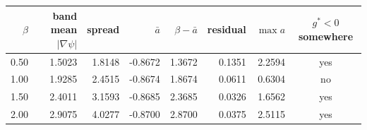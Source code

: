 \begin{tabular}{rrrrrrrc}
\toprule
$\beta$ & band mean $|\nabla\psi|$ & spread & $\bar a$ & $\beta-\bar a$ & residual & $\max a$ & $g^*<0$ somewhere \\
\midrule
0.50 & 1.5023 & 1.8148 & -0.8672 & 1.3672 & 0.1351 & 2.2594 & yes \\
1.00 & 1.9285 & 2.4515 & -0.8674 & 1.8674 & 0.0611 & 0.6304 & no \\
1.50 & 2.4011 & 3.1593 & -0.8685 & 2.3685 & 0.0326 & 1.6562 & yes \\
2.00 & 2.9075 & 4.0277 & -0.8700 & 2.8700 & 0.0375 & 2.5115 & yes \\
\bottomrule
\end{tabular}
